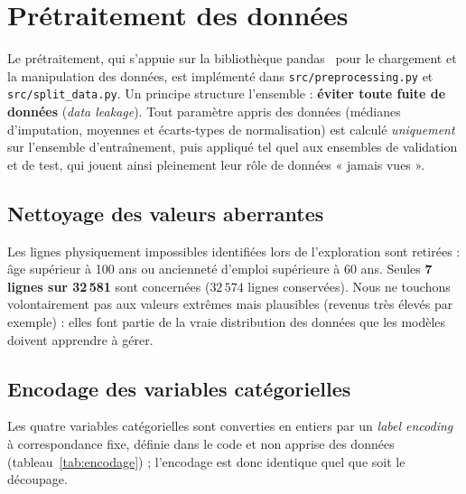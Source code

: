 
\section{Prétraitement des données}
\label{sec:pretraitement}

Le prétraitement, qui s'appuie sur la bibliothèque pandas~\cite{mckinney2010pandas}
pour le chargement et la manipulation des données, est implémenté dans
\texttt{src/preprocessing.py} et \texttt{src/split\_data.py}. Un principe
structure l'ensemble :
\textbf{éviter toute fuite de données} (\emph{data leakage}). Tout paramètre
appris des données (médianes d'imputation, moyennes et écarts-types de
normalisation) est calculé \emph{uniquement} sur l'ensemble d'entraînement,
puis appliqué tel quel aux ensembles de validation et de test, qui jouent ainsi
pleinement leur rôle de données « jamais vues ».

\subsection{Nettoyage des valeurs aberrantes}

Les lignes physiquement impossibles identifiées lors de l'exploration sont
retirées : âge supérieur à 100 ans ou ancienneté d'emploi supérieure à 60 ans.
Seules \textbf{7 lignes sur 32\,581} sont concernées ($32\,574$ lignes
conservées). Nous ne touchons volontairement pas aux valeurs extrêmes mais
plausibles (revenus très élevés par exemple) : elles font partie de la vraie
distribution des données que les modèles doivent apprendre à gérer.

\subsection{Encodage des variables catégorielles}

Les quatre variables catégorielles sont converties en entiers par un
\emph{label encoding} à correspondance fixe, définie dans le code et non
apprise des données (tableau~\ref{tab:encodage}) ; l'encodage est donc
identique quel que soit le découpage.

